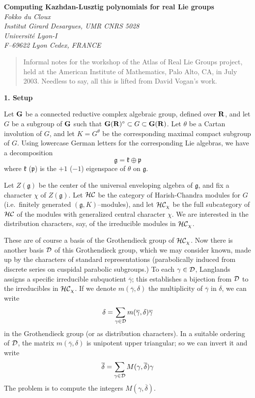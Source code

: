 \documentclass[11 pt]{article}
\def\ov{\overline}
\def\D{{\cal D}}
\def\d{\delta}
\def\G{{\bf G}}
\def\g{\gamma}
\def\gf{{\mathfrak g}}
\def\HC{{\cal HC}}
\def\kf{{\mathfrak k}}
\def\pf{{\mathfrak p}}
\def\R{{\bf R}}
\def\t{\theta}
\begin{document}
\begin{center}
\textbf{Computing Kazhdan-Lusztig polynomials for real Lie groups}\\
\bigskip
\textit{Fokko du Cloux}\\
\textit{Institut Girard Desargues, UMR CNRS 5028}\\
\textit{Universit\'e Lyon-I}\\
\textit{F--69622 Lyon Cedex, FRANCE}
\end{center}

\bigskip

\begin{quote}
\noindent Informal notes for the workshop of the
Atlas of Real Lie Groups project, held at the American Institute of
Mathematics, Palo Alto, CA, in July 2003. Needless to say, all this
is lifted from David Vogan's work.
\end{quote}

\bigskip

\noindent\textbf{1. Setup}

\medskip

\noindent Let $\G$ be a connected reductive complex algebraic group, defined
over $\R$, and let $G$ be a subgroup of $\G$ such that $\G(\R)^\circ\subset G
\subset\G(\R)$. Let $\t$ be a Cartan involution of $G$, and let $K=G^\t$ be
the corresponding maximal compact subgroup of $G$. Using lowercase German
letters for the corresponding Lie algebras, we have a decomposition
$$
\gf=\kf\oplus\pf
$$
where $\kf$ ($\pf$) is the $+1$ ($-1$) eigenspace of $\t$ on $\gf$.

Let $Z(\gf)$ be the center of the universal enveloping algebra of $\gf$, and
fix a character $\chi$ of $Z(\gf)$. Let $\HC$ be the category of Harish-Chandra
modules for $G$ (i.e.\ finitely generated $(\gf,K)$--modules), and let 
$\HC_\chi$ be the full subcategory of $\HC$ of the
modules with generalized central character $\chi$. We are interested in the
distribution characters, say, of the irreducible modules in $\HC_\chi$.

These are of course a basis of the Grothendieck group of $\HC_\chi$. Now there
is another basis $\D$ of this Grothendieck group, which we may consider known,
made up by the characters of standard representations (parabolically induced
from discrete series on cuspidal parabolic subgroups.) To each $\g\in\D$,
Langlands assigns a specific irreducible subquotient $\ov\g$; this establishes
a bijection from $\D$ to the irreducibles in $\HC_\chi$. If we denote
$m(\ov\g,\d)$ the multiplicity of $\ov\g$ in $\d$, we can write
$$
\d=\sum_{\g\in\D}m(\ov\g,\d)\ov\g
$$
in the Grothendieck group (or as distribution characters). In a suitable
ordering of $\D$, the matrix $m(\ov\g,\d)$ is unipotent upper triangular; so
we can invert it and write
$$
\ov\d=\sum_{\g\in\D}M(\g,\ov\d)\g
$$
The problem is to compute the integers $M(\g,\ov\d)$.
\end{document}
